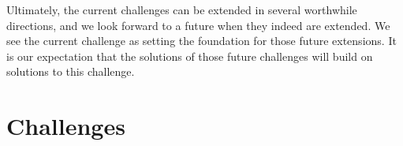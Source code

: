 \documentclass[runningheads]{llncs}
\begin{document}
Ultimately, the current challenges can be extended in several
worthwhile directions, and we look forward to a future when they
indeed are extended. We see the current challenge as setting
the foundation for those future extensions. It is our expectation that
the solutions of those future challenges will build on solutions
to this challenge.

\appendix
\section{Challenges}\label{app:challenges}




\end{document}
